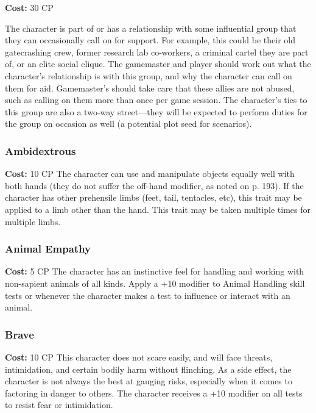 \textbf{Cost:} 30 CP

The character is part of or has a relationship with 
some influential group that they can occasionally call 
on for support. For example, this could be their old 
gatecrashing crew, former research lab co-workers, 
a criminal cartel they are part of, or an elite social 
clique. The gamemaster and player should work out 
what the character's relationship is with this group, 
and why the character can call on them for aid. 
Gamemaster's should take care that these allies are 
not abused, such as calling on them more than once 
per game session. The character's ties to this group 
are also a two-way street—they will be expected to 
perform duties for the group on occasion as well (a 
potential plot seed for scenarios).

\subsubsection{Ambidextrous}

\textbf{Cost:} 10 CP
The character can use and manipulate objects 
equally well with both hands (they do not suffer the 
off-hand modifier, as noted on p. 193). If the character
has other prehensile limbs (feet, tail, tentacles,
etc), this trait may be applied to a limb other than 
the hand. This trait may be taken multiple times for 
multiple limbs.

\subsubsection{Animal Empathy}

\textbf{Cost:} 5 CP
The character has an instinctive feel for handling 
and working with non-sapient animals of all kinds. 
Apply a +10 modifier to Animal Handling skill tests 
or whenever the character makes a test to influence or 
interact with an animal.

\subsubsection{Brave}

\textbf{Cost:} 10 CP
This character does not scare easily, and will face 
threats, intimidation, and certain bodily harm without
flinching. As a side effect, the character is not
always the best at gauging risks, especially when it 
comes to factoring in danger to others. The character
receives a +10 modifier on all tests to resist fear
or intimidation.

